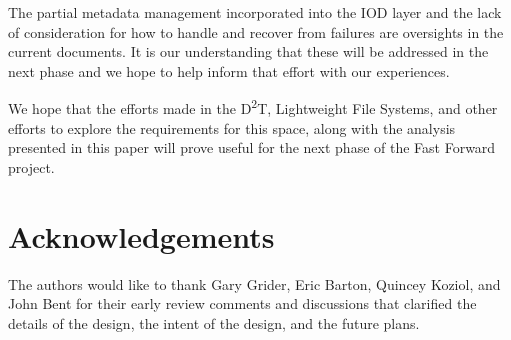 \documentclass[conference]{IEEEtran}
\newcommand{\DDTns}{D\textsuperscript{2}T}
\begin{document}
The partial metadata management incorporated into the IOD layer and the lack of
consideration for how to handle and recover from failures are oversights in the
current documents. It is our understanding that these will be addressed in the
next phase and we hope to help inform that effort with our experiences.

We hope that the efforts made in the \DDTns, Lightweight File Systems, and
other efforts to explore the requirements for this space, along with the
analysis presented in this paper will prove useful for the next phase of the
Fast Forward project.

\section{Acknowledgements}
The authors would like to thank Gary Grider, Eric Barton, Quincey Koziol, and
John Bent for their early review comments and discussions that clarified the
details of the design, the intent of the design, and the future plans.
\end{document}
